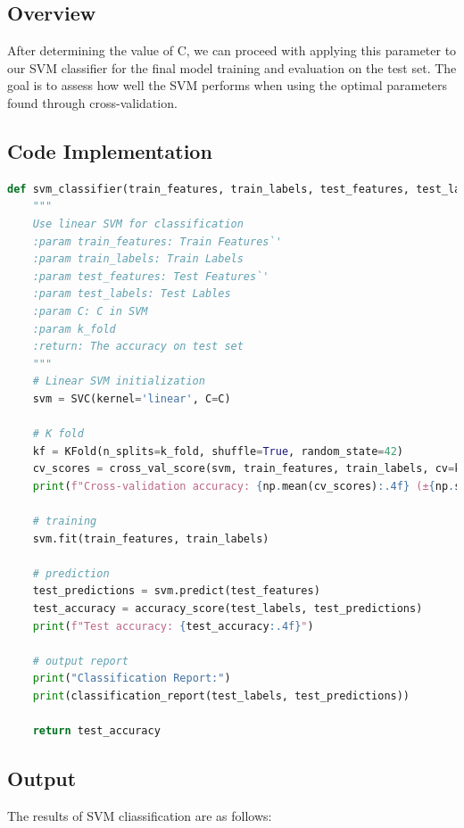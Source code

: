\documentclass[lang=cn]{elegantpaper}
\begin{document}
\subsection{Overview}

After determining the value of C, we can proceed with applying this parameter to our SVM classifier for the final model training and evaluation on the test set. The goal is to assess how well the SVM performs when using the optimal parameters found through cross-validation.

\subsection{Code Implementation}

\begin{lstlisting}[language=Python]
def svm_classifier(train_features, train_labels, test_features, test_labels, C=1e-3, k_fold=5):
    """
    Use linear SVM for classification
    :param train_features: Train Features`'
    :param train_labels: Train Labels
    :param test_features: Test Features`'
    :param test_labels: Test Lables
    :param C: C in SVM
    :param k_fold
    :return: The accuracy on test set
    """
    # Linear SVM initialization
    svm = SVC(kernel='linear', C=C)

    # K fold
    kf = KFold(n_splits=k_fold, shuffle=True, random_state=42)
    cv_scores = cross_val_score(svm, train_features, train_labels, cv=kf, scoring='accuracy')
    print(f"Cross-validation accuracy: {np.mean(cv_scores):.4f} (±{np.std(cv_scores):.4f})")

    # training
    svm.fit(train_features, train_labels)

    # prediction
    test_predictions = svm.predict(test_features)
    test_accuracy = accuracy_score(test_labels, test_predictions)
    print(f"Test accuracy: {test_accuracy:.4f}")

    # output report
    print("Classification Report:")
    print(classification_report(test_labels, test_predictions))

    return test_accuracy
\end{lstlisting}

\subsection{Output}

The results of SVM cliassification are as follows:
\end{document}
